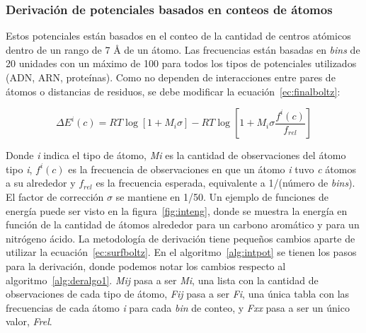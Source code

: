 \subsubsection{Derivación de potenciales basados en conteos de átomos}
\par
Estos potenciales están basados en el conteo de la cantidad de centros atómicos dentro de un rango de 7 \si{\angstrom} de un átomo.
Las frecuencias están basadas en \textit{bins} de 20 unidades con un máximo de 100 para todos los tipos de potenciales utilizados (ADN, ARN, proteínas).
Como no dependen de interacciones entre pares de átomos o distancias de residuos, se debe modificar la ecuación~\ref{ec:finalboltz}:

\begin{equation}
\Delta E^{i}(c) = RT\log \left[1 + M_{i}\sigma\right] - RT\log \left[ 1 + M_{i}\sigma \frac{f^{i}(c)}{f_{rel}} \right] \label{ec:surfboltz}
\end{equation}

Donde \textit{i} indica el tipo de átomo, \textit{Mi} es la cantidad de observaciones del átomo tipo \textit{i}, \textit{$f^{i}(c)$} es la frecuencia de observaciones en que un átomo \textit{i} tuvo \textit{c} átomos a su alrededor y \textit{$f_{rel}$} es la frecuencia esperada, equivalente a 1/(número de \textit{bins}).
El factor de corrección $\sigma$ se mantiene en 1/50.
Un ejemplo de funciones de energía puede ser visto en la figura~\ref{fig:inteng}, donde se muestra la energía en función de la cantidad de átomos alrededor para un carbono aromático y para un nitrógeno ácido.
La metodología de derivación tiene pequeños cambios aparte de utilizar la ecuación~\ref{ec:surfboltz}.
En el algoritmo~\ref{alg:intpot} se tienen los pasos para la derivación, donde podemos notar los cambios respecto al algoritmo~\ref{alg:deralgo1}.
\textit{Mij} pasa a ser \textit{Mi}, una lista con la cantidad de observaciones de cada tipo de átomo, \textit{Fij} pasa a ser \textit{Fi}, una única tabla con las frecuencias de cada átomo \textit{i} para cada \textit{bin} de conteo, y \textit{Fxx} pasa a ser un único valor, \textit{Frel}.


